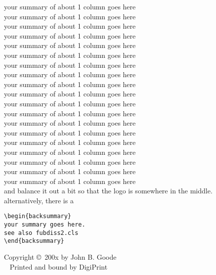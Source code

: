 {your summary of about 1 column goes here\\
your summary of about 1 column goes here\\
your summary of about 1 column goes here\\
your summary of about 1 column goes here\\
your summary of about 1 column goes here\\
your summary of about 1 column goes here\\
your summary of about 1 column goes here\\
your summary of about 1 column goes here\\
your summary of about 1 column goes here\\
your summary of about 1 column goes here\\
your summary of about 1 column goes here\\
your summary of about 1 column goes here\\
your summary of about 1 column goes here\\
your summary of about 1 column goes here\\
your summary of about 1 column goes here\\
your summary of about 1 column goes here\\
your summary of about 1 column goes here\\
your summary of about 1 column goes here\\
your summary of about 1 column goes here\\
and balance it out a bit so that the logo is somewhere in the middle. alternatively, there is a 
\begin{verbatim}
\begin{backsummary} 
your summary goes here. 
see also fubdiss2.cls
\end{backsummary}
\end{verbatim}
\begin{center}
\par\vspace {3.5cm}
\noindent%
\fublogo{7cm}
\end{center}
\vfill

%
\noindent%
\hfill Copyright \copyright\ 200x by John B. Goode\\[1ex] %
\noindent \mbox{ } \hfill Printed and bound by DigiPrint\\[2ex]           %
} 

